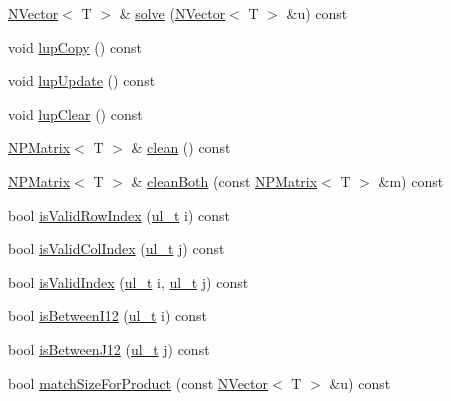 \begin{DoxyCompactItemize}
\item 
\mbox{\hyperlink{class_n_vector}{N\+Vector}}$<$ T $>$ \& \mbox{\hyperlink{class_n_p_matrix_a416d816f2f0d1f01f739b10c82f42d29}{solve}} (\mbox{\hyperlink{class_n_vector}{N\+Vector}}$<$ T $>$ \&u) const
\item 
void \mbox{\hyperlink{class_n_p_matrix_a2eba5b3c2096bfb2ccac4e077880942a}{lup\+Copy}} () const
\item 
void \mbox{\hyperlink{class_n_p_matrix_ab0bb16a2c2fb70a2294eb5f64c5530df}{lup\+Update}} () const
\item 
void \mbox{\hyperlink{class_n_p_matrix_aa10cc45e0f51b547e4b9a9b89e95d007}{lup\+Clear}} () const
\item 
\mbox{\hyperlink{class_n_p_matrix}{N\+P\+Matrix}}$<$ T $>$ \& \mbox{\hyperlink{class_n_p_matrix_ad6c14f6a92b15709ddee8213067c8955}{clean}} () const
\item 
\mbox{\hyperlink{class_n_p_matrix}{N\+P\+Matrix}}$<$ T $>$ \& \mbox{\hyperlink{class_n_p_matrix_abbee6873ebebfb5080a9719e4154f638}{clean\+Both}} (const \mbox{\hyperlink{class_n_p_matrix}{N\+P\+Matrix}}$<$ T $>$ \&m) const
\item 
bool \mbox{\hyperlink{class_n_p_matrix_afc5221cb1f5d1e1919801a0ff32751fe}{is\+Valid\+Row\+Index}} (\mbox{\hyperlink{group___n_algebra_ga1b140a2034db3f5dfe18a987745df43a}{ul\+\_\+t}} i) const
\item 
bool \mbox{\hyperlink{class_n_p_matrix_ab3f19d6c9259ef6e0a919ea7ad85a5a1}{is\+Valid\+Col\+Index}} (\mbox{\hyperlink{group___n_algebra_ga1b140a2034db3f5dfe18a987745df43a}{ul\+\_\+t}} j) const
\item 
bool \mbox{\hyperlink{class_n_p_matrix_a3d584ab75f97711997f39ffefef1f78b}{is\+Valid\+Index}} (\mbox{\hyperlink{group___n_algebra_ga1b140a2034db3f5dfe18a987745df43a}{ul\+\_\+t}} i, \mbox{\hyperlink{group___n_algebra_ga1b140a2034db3f5dfe18a987745df43a}{ul\+\_\+t}} j) const
\item 
bool \mbox{\hyperlink{class_n_p_matrix_a0c1a788260180b0df60b8d049d121859}{is\+Between\+I12}} (\mbox{\hyperlink{group___n_algebra_ga1b140a2034db3f5dfe18a987745df43a}{ul\+\_\+t}} i) const
\item 
bool \mbox{\hyperlink{class_n_p_matrix_aeb0ca9af7c136d9ffa4d27226c922591}{is\+Between\+J12}} (\mbox{\hyperlink{group___n_algebra_ga1b140a2034db3f5dfe18a987745df43a}{ul\+\_\+t}} j) const
\item 
bool \mbox{\hyperlink{class_n_p_matrix_a748282f2d472970dbd20e3b2f6d62032}{match\+Size\+For\+Product}} (const \mbox{\hyperlink{class_n_vector}{N\+Vector}}$<$ T $>$ \&u) const

\end{DoxyCompactItemize}
